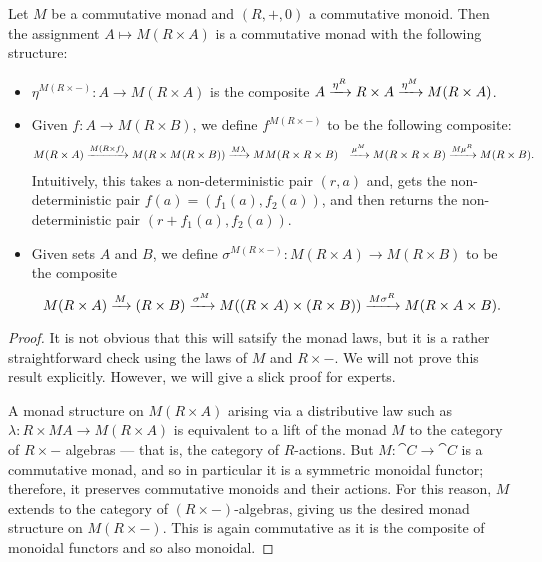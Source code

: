 \documentclass[DynamicalBook]{subfiles}
\begin{document}
\begin{proposition}
Let $M$ be a commutative monad and $(R, +, 0)$ a commutative monoid. Then the
assignment $A \mapsto M(R \times A)$ is a commutative monad with the following
structure:
\begin{itemize}
  \item $\eta^{M(R\times -)} : A \to M(R \times A)$ is the composite $A
    \xrightarrow{\eta^R} R \times A \xrightarrow{\eta^M} M(R \times A)$.
  \item Given $f : A \to M(R \times B)$, we define $f^{M(R \times -)}$ to be the
    following composite:
    \begin{align*}
M(R \times A) &\xrightarrow{M(R \times f)} M(R \times M(R \times B)) \xrightarrow{M\lambda} MM(R \times R \times B)
&\xrightarrow{\mu^{M}} M(R \times R \times B) \xrightarrow{M\mu^R} M(R \times B).
      \end{align*}
 Intuitively, this takes a non-deterministic pair $(r, a)$ and, gets the
 non-deterministic pair $f(a) = (f_1(a), f_2(a))$, and then returns the
 non-deterministic pair $(r + f_1(a), f_2(a))$.
  \item Given sets $A$ and $B$, we define $\sigma^{M(R \times -)} : M(R \times
    A) \to M(R \times B)$ to be the composite
    \[
M(R \times A) \xrightarrow{M}(R \times B) \xrightarrow{\sigma^M} M((R \times A) \times (R \times
B)) \xrightarrow{M\sigma^R} M(R \times A \times B).
    \]
\end{itemize}
\end{proposition}
\begin{proof}
It is not obvious that this will satsify the monad laws, but it is a rather
straightforward check using the laws of $M$ and $R \times -$. We will not prove
this result explicitly. However, we will give a slick proof for experts.

A monad structure on $M(R \times A)$ arising via a distributive law such as
$\lambda : R \times MA \to M(R \times A)$ is equivalent to a lift of the monad
$M$ to the category of $R \times -$ algebras --- that is, the category of
$R$-actions. But $M : \cat{C} \to \cat{C}$ is a commutative monad, and so in particular it is a
symmetric monoidal functor; therefore, it preserves commutative monoids and
their actions. For this reason, $M$ extends to the category of $(R \times -)$-algebras, giving
us the desired monad structure on $M(R \times -)$. This is again commutative as
it is the composite of monoidal functors and so also monoidal.
\end{proof}
\end{document}
